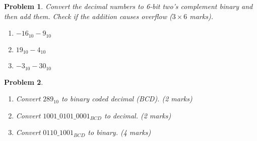 \documentclass{article}
\newtheorem{prob}{Problem}
\begin{document}
\vspace{20em}

\begin{prob}
  Convert the decimal numbers to 6-bit two's complement binary and then add
  them. Check if the addition causes overflow ($3 \times 6$ marks).
  \begin{enumerate}
  \item $-16_{10} - 9_{10}$
  \item $19_{10} - 4_{10}$
  \item $-3_{10} - 30_{10}$
  \end{enumerate}
\end{prob}

\vspace{20em}

\begin{prob}
  \begin{enumerate}
  \item Convert $289_{10}$  to binary coded decimal (BCD). (2 marks)
  \item Convert $1001\_ 0101\_ 0001_{BCD}$  to decimal. (2 marks)
  \item Convert $0110\_ 1001_{BCD}$  to binary. (4 marks)
  \end{enumerate}
\end{prob}

\vspace{20em}
\end{document}
